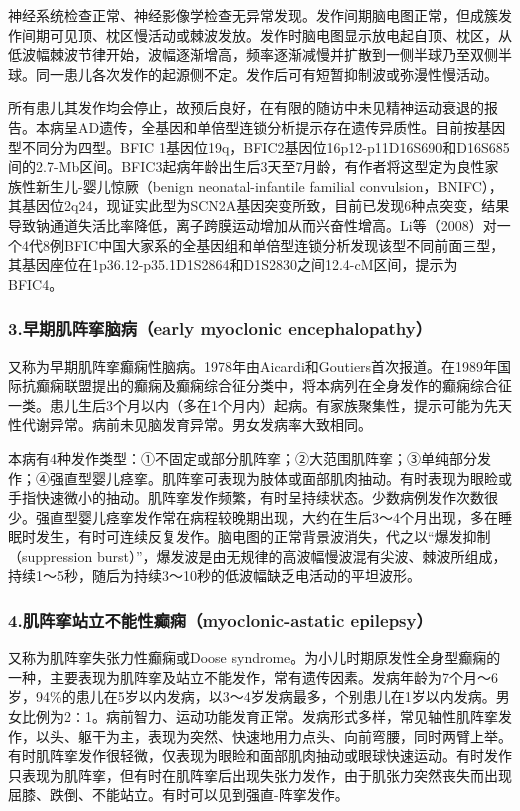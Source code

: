 神经系统检查正常、神经影像学检查无异常发现。发作间期脑电图正常，但成簇发作间期可见顶、枕区慢活动或棘波发放。发作时脑电图显示放电起自顶、枕区，从低波幅棘波节律开始，波幅逐渐增高，频率逐渐减慢并扩散到一侧半球乃至双侧半球。同一患儿各次发作的起源侧不定。发作后可有短暂抑制波或弥漫性慢活动。

所有患儿其发作均会停止，故预后良好，在有限的随访中未见精神运动衰退的报告。本病呈AD遗传，全基因和单倍型连锁分析提示存在遗传异质性。目前按基因型不同分为四型。BFIC
1基因位19q，BFIC2基因位16p12-p11D16S690和D16S685间的2.7-Mb区间。BFIC3起病年龄出生后3天至7月龄，有作者将这型定为良性家族性新生儿-婴儿惊厥（benign
neonatal-infantile familial
convulsion，BNIFC），其基因位2q24，现证实此型为SCN2A基因突变所致，目前已发现6种点突变，结果导致钠通道失活比率降低，离子跨膜运动增加从而兴奋性增高。Li等（2008）对一个4代8例BFIC中国大家系的全基因组和单倍型连锁分析发现该型不同前面三型，其基因座位在1p36.12-p35.1D1S2864和D1S2830之间12.4-cM区间，提示为BFIC4。

\subsubsection{3.早期肌阵挛脑病（early myoclonic encephalopathy）}

又称为早期肌阵挛癫痫性脑病。1978年由Aicardi和Goutiers首次报道。在1989年国际抗癫痫联盟提出的癫痫及癫痫综合征分类中，将本病列在全身发作的癫痫综合征一类。患儿生后3个月以内（多在1个月内）起病。有家族聚集性，提示可能为先天性代谢异常。病前未见脑发育异常。男女发病率大致相同。

本病有4种发作类型：①不固定或部分肌阵挛；②大范围肌阵挛；③单纯部分发作；④强直型婴儿痉挛。肌阵挛可表现为肢体或面部肌肉抽动。有时表现为眼睑或手指快速微小的抽动。肌阵挛发作频繁，有时呈持续状态。少数病例发作次数很少。强直型婴儿痉挛发作常在病程较晚期出现，大约在生后3～4个月出现，多在睡眠时发生，有时可连续反复发作。脑电图的正常背景波消失，代之以“爆发抑制（suppression
burst）”，爆发波是由无规律的高波幅慢波混有尖波、棘波所组成，持续1～5秒，随后为持续3～10秒的低波幅缺乏电活动的平坦波形。

\subsubsection{4.肌阵挛站立不能性癫痫（myoclonic-astatic epilepsy）}

又称为肌阵挛失张力性癫痫或Doose
syndrome。为小儿时期原发性全身型癫痫的一种，主要表现为肌阵挛及站立不能发作，常有遗传因素。发病年龄为7个月～6岁，94\%的患儿在5岁以内发病，以3～4岁发病最多，个别患儿在1岁以内发病。男女比例为2∶1。病前智力、运动功能发育正常。发病形式多样，常见轴性肌阵挛发作，以头、躯干为主，表现为突然、快速地用力点头、向前弯腰，同时两臂上举。有时肌阵挛发作很轻微，仅表现为眼睑和面部肌肉抽动或眼球快速运动。有时发作只表现为肌阵挛，但有时在肌阵挛后出现失张力发作，由于肌张力突然丧失而出现屈膝、跌倒、不能站立。有时可以见到强直-阵挛发作。

